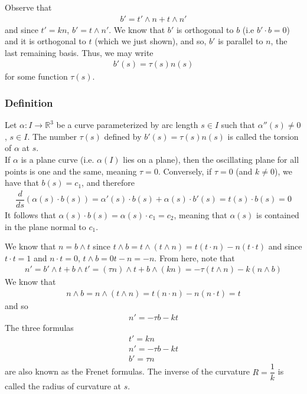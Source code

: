 \documentclass{article}
\newcommand{\R}{\mathbb{R}}
\begin{document}
	Observe that
	\begin{gather*}
		b' = t' \wedge n + t \wedge n'
	\end{gather*}
	and since $t' = kn$, $b' = t \wedge n'$. We know that $b'$ is orthogonal to $b$ (i.e $b' \cdot b = 0$) and it is orthogonal to $t$ (which we just shown), and so, $b'$ is parallel to $n$, the last remaining basis. Thus, we may write
	\begin{gather*}
		b'(s) = \tau(s) n(s)
	\end{gather*}
	for some function $\tau(s)$.
	
	\subsubsection*{Definition}
	Let $\alpha \colon I \to \R^3$ be a curve parameterized by arc length $s \in I$ such that $\alpha''(s) \neq 0$, $s \in I$. The number $\tau(s)$ defined by $b'(s) = \tau(s) n(s)$ is called the torsion of $\alpha$ at $s$. \\
	
	If $\alpha$ is a plane curve (i.e. $\alpha(I)$ lies on a plane), then the oscillating plane for all points is one and the same, meaning $\tau = 0$. Conversely, if $\tau = 0$ (and $k \neq 0$), we have that $b(s) = c_1$, and therefore
	\begin{gather*}
		\dfrac{d}{ds} (\alpha(s) \cdot b(s)) = \alpha'(s) \cdot b(s) + \alpha(s) \cdot b'(s) = t(s) \cdot b(s) = 0
	\end{gather*}
	It follows that $\alpha(s) \cdot b(s) = \alpha(s) \cdot c_1  = c_2$, meaning that $\alpha(s)$ is contained in the plane normal to $c_1$.
	
	We know that $n = b \wedge t$ since $t \wedge b = t \wedge (t \wedge n) = t(t \cdot n) - n(t \cdot t)$ and since $t \cdot t = 1$ and $n \cdot t = 0$, $t \wedge b = 0t -n = -n$. From here, note that
	\begin{gather*}
		n' = b' \wedge t + b \wedge t' = (\tau n) \wedge t + b \wedge (kn) = -\tau (t \wedge n) - k(n \wedge b)
	\end{gather*}
	We know that
	\begin{gather*}
		n \wedge b = n \wedge (t \wedge n) = t(n \cdot n) - n(n \cdot t) = t
	\end{gather*}
	and so
	\begin{gather*}
		n' = -\tau b - k t
	\end{gather*}
	The three formulas
	\begin{gather*}
		t' = kn \\
		n' = -\tau b - k t \\
		b' = \tau n
	\end{gather*}
	are also known as the Frenet formulas. The inverse of the curvature $R = \dfrac{1}{k}$ is called the radius of curvature at $s$. 
	
\end{document}
